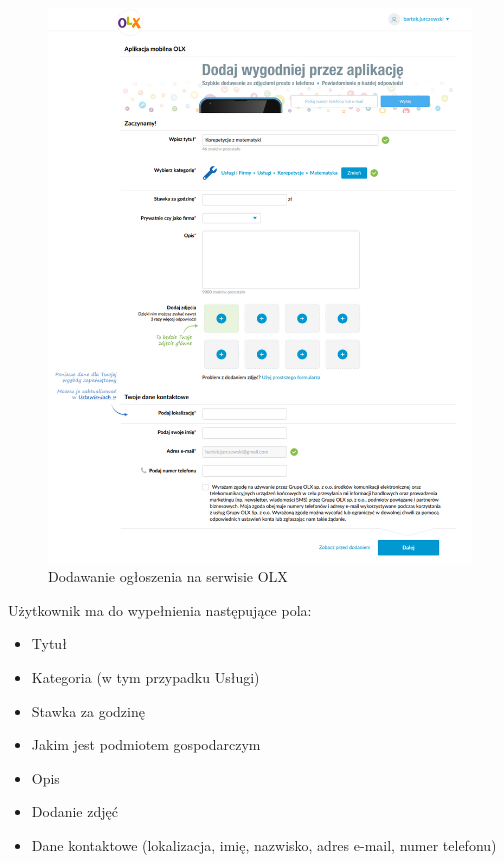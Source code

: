 \documentclass[12pt]{article}
\numberwithin{figure}{section}
\begin{document}
\begin{sloppypar}
    \begin{figure}[H]
    	\centering
    	\includegraphics[width=1\textwidth]{images/chapter_2/olx-add-announcement.png}
    	\caption{Dodawanie ogłoszenia na serwisie OLX}
    	\label{fig:olx-add-announcement}
    \end{figure}

Użytkownik ma do wypełnienia następujące pola:
\begin{itemize}
    \item Tytuł
    \item Kategoria (w tym przypadku Usługi)
    \item Stawka za godzinę
    \item Jakim jest podmiotem gospodarczym
    \item Opis
    \item Dodanie zdjęć
    \item Dane kontaktowe (lokalizacja, imię, nazwisko, adres e-mail, numer telefonu)
\end{itemize}


\end{sloppypar}
\end{document}
